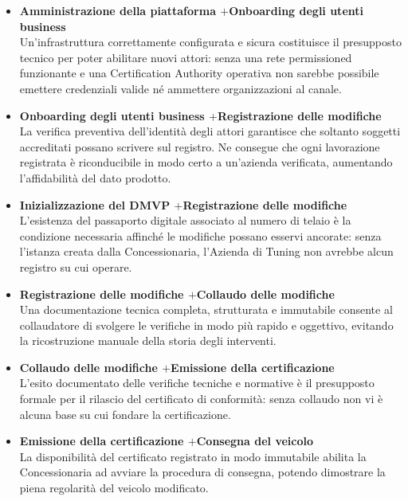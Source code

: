 \begin{itemize}
    \item \textbf{Amministrazione della piattaforma \quad$+$\quad Onboarding degli utenti business}\\
    Un'infrastruttura correttamente configurata e sicura costituisce il presupposto tecnico per poter abilitare nuovi attori: senza una rete permissioned funzionante e una Certification Authority operativa non sarebbe possibile emettere credenziali valide né ammettere organizzazioni al canale.

    \item \textbf{Onboarding degli utenti business \quad$+$\quad Registrazione delle modifiche}\\
    La verifica preventiva dell'identità degli attori garantisce che soltanto soggetti accreditati possano scrivere sul registro. Ne consegue che ogni lavorazione registrata è riconducibile in modo certo a un'azienda verificata, aumentando l'affidabilità del dato prodotto.

    \item \textbf{Inizializzazione del DMVP \quad$+$\quad Registrazione delle modifiche}\\
    L'esistenza del passaporto digitale associato al numero di telaio è la condizione necessaria affinché le modifiche possano esservi ancorate: senza l'istanza creata dalla Concessionaria, l'Azienda di Tuning non avrebbe alcun registro su cui operare.

    \item \textbf{Registrazione delle modifiche \quad$+$\quad Collaudo delle modifiche}\\
    Una documentazione tecnica completa, strutturata e immutabile consente al collaudatore di svolgere le verifiche in modo più rapido e oggettivo, evitando la ricostruzione manuale della storia degli interventi.

    \item \textbf{Collaudo delle modifiche \quad$+$\quad Emissione della certificazione}\\
    L'esito documentato delle verifiche tecniche e normative è il presupposto formale per il rilascio del certificato di conformità: senza collaudo non vi è alcuna base su cui fondare la certificazione.

    \item \textbf{Emissione della certificazione \quad$+$\quad Consegna del veicolo}\\
    La disponibilità del certificato registrato in modo immutabile abilita la Concessionaria ad avviare la procedura di consegna, potendo dimostrare la piena regolarità del veicolo modificato.


\end{itemize}
